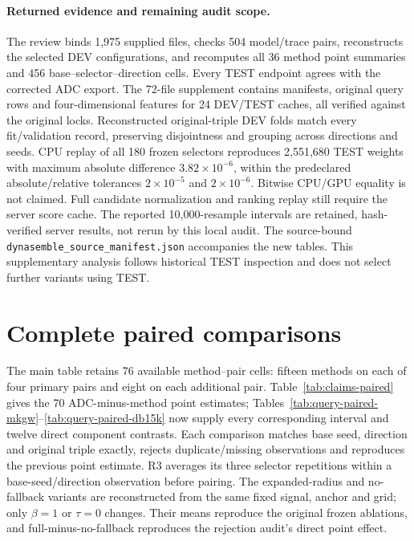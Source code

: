 \documentclass[11pt,a4paper]{article}
\begin{document}
\paragraph{Returned evidence and remaining audit scope.}
The review binds 1,975 supplied files, checks 504 model/trace pairs, reconstructs the selected DEV configurations, and recomputes all 36 method point summaries and 456 base--selector--direction cells. Every TEST endpoint agrees with the corrected ADC export. The 72-file supplement contains manifests, original query rows and four-dimensional features for 24 DEV/TEST caches, all verified against the original locks. Reconstructed original-triple DEV folds match every fit/validation record, preserving disjointness and grouping across directions and seeds. CPU replay of all 180 frozen selectors reproduces 2,551,680 TEST weights with maximum absolute difference $3.82\times10^{-6}$, within the predeclared absolute/relative tolerances $2\times10^{-5}$ and $2\times10^{-6}$. Bitwise CPU/GPU equality is not claimed. Full candidate normalization and ranking replay still require the server score cache. The reported 10,000-resample intervals are retained, hash-verified server results, not rerun by this local audit. The source-bound \texttt{dynasemble\_source\_manifest.json} accompanies the new tables. This supplementary analysis follows historical TEST inspection and does not select further variants using TEST.

\section{Complete paired comparisons}
\label{app:claims-effects}
The main table retains 76 available method--pair cells: fifteen methods on each of four primary pairs and eight on each additional pair. Table~\ref{tab:claims-paired} gives the 70 ADC-minus-method point estimates; Tables~\ref{tab:query-paired-mkgw}--\ref{tab:query-paired-db15k} now supply every corresponding interval and twelve direct component contrasts. Each comparison matches base seed, direction and original triple exactly, rejects duplicate/missing observations and reproduces the previous point estimate. R3 averages its three selector repetitions within a base-seed/direction observation before pairing. The expanded-radius and no-fallback variants are reconstructed from the same fixed signal, anchor and grid; only $\beta=1$ or $\tau=0$ changes. Their means reproduce the original frozen ablations, and full-minus-no-fallback reproduces the rejection audit's direct point effect.
\end{document}

